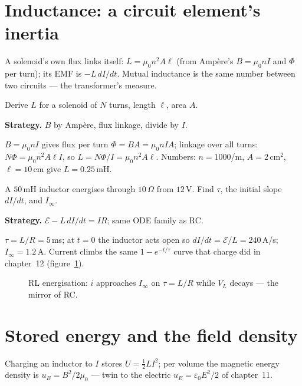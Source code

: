 \section{Inductance: a circuit element's inertia}\label{sec:far-ind}

A solenoid's own flux links itself:
$L=\mu_0n^{2}A\ell$ (from Amp\`ere's $B=\mu_0nI$ and
$\Phi$ per turn); its EMF is $-L\,dI/dt$. Mutual inductance is the same
number between two circuits --- the transformer's measure.

\begin{example}\label{ex:solL}
Derive $L$ for a solenoid of $N$ turns, length $\ell$, area $A$.
\par\smallskip
\textbf{Strategy.} $B$ by Amp\`ere, flux linkage, divide by $I$.
\begin{solution}
$B=\mu_0nI$ gives flux per turn $\Phi=BA=\mu_0nIA$; linkage over all
turns: $N\Phi=\mu_0n^{2}A\ell I$, so
$L=N\Phi/I=\mu_0n^{2}A\ell$. Numbers: $n=1000$/m, $A=2$\,cm$^{2}$,
$\ell=10$\,cm give $L=0.25$\,mH. \checkmark
\end{solution}
\end{example}

\begin{example}[RL energisation]\label{ex:rl}
A $50$\,mH inductor energises through $10\,\Omega$ from $12$\,V.
Find $\tau$, the initial slope $dI/dt$, and $I_\infty$.
\par\smallskip
\textbf{Strategy.} $\mathcal E-L\,dI/dt=IR$; same ODE family as RC.
\begin{solution}
$\tau=L/R=5$\,ms; at $t=0$ the inductor acts open so
$dI/dt=\mathcal E/L=240$\,A/s; $I_\infty=1.2$\,A.
Current climbs the same $1-e^{-t/\tau}$ curve that charge did in
chapter~12 (figure~\ref{fig:rlcur}). \checkmark
\end{solution}
\end{example}

\begin{figure}[htbp]\centering

\caption{RL energisation: $i$ approaches $I_\infty$ on $\tau=L/R$ while
$V_L$ decays --- the mirror of RC.}
\label{fig:rlcur}
\end{figure}

\section{Stored energy and the field density}\label{sec:far-u}

Charging an inductor to $I$ stores $U=\tfrac12LI^{2}$; per volume the
magnetic energy density is $u_B=B^{2}/2\mu_0$ --- twin to the electric
$u_E=\varepsilon_0E^{2}/2$ of chapter~11.

